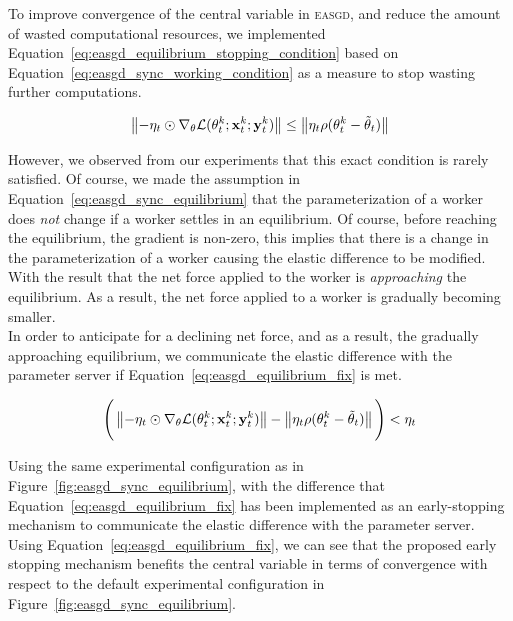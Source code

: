 To improve convergence of the central variable in \textsc{easgd}, and reduce the amount of wasted computational resources, we implemented Equation~\ref{eq:easgd_equilibrium_stopping_condition} based on Equation~\ref{eq:easgd_sync_working_condition} as a measure to stop wasting further computations.

\begin{equation}
  \label{eq:easgd_equilibrium_stopping_condition}
  \left\lVert-\eta_t \odot \nabla_\theta \mathcal{L}(\theta^k_t;\mathbf{x}^k_t;\mathbf{y}^k_t)\right\rVert \leq \left\lVert\eta_t\rho(\theta^k_t - \tilde{\theta}_t)\right\rVert
\end{equation}

However, we observed from our experiments that this exact condition is rarely satisfied. Of course, we made the assumption in Equation~\ref{eq:easgd_sync_equilibrium} that the parameterization of a worker does \emph{not} change if a worker settles in an equilibrium. Of course, before reaching the equilibrium, the gradient is non-zero, this implies that there is a change in the parameterization of a worker causing the elastic difference to be modified. With the result that the net force applied to the worker is \emph{approaching} the equilibrium. As a result, the net force applied to a worker is gradually becoming smaller.\\

In order to anticipate for a declining net force, and as a result, the gradually approaching equilibrium, we communicate the elastic difference with the parameter server if Equation~\ref{eq:easgd_equilibrium_fix} is met.

\begin{equation}
  \label{eq:easgd_equilibrium_fix}
  \Bigg(\left\lVert-\eta_t \odot \nabla_\theta \mathcal{L}(\theta^k_t;\mathbf{x}^k_t;\mathbf{y}^k_t)\right\rVert - \left\lVert\eta_t\rho(\theta^k_t - \tilde{\theta}_t)\right\rVert\Bigg) < \eta_t
\end{equation}

Using the same experimental configuration as in Figure~\ref{fig:easgd_sync_equilibrium}, with the difference that Equation~\ref{eq:easgd_equilibrium_fix} has been implemented as an early-stopping mechanism to communicate the elastic difference with the parameter server. Using Equation~\ref{eq:easgd_equilibrium_fix}, we can see that the proposed early stopping mechanism benefits the central variable in terms of convergence with respect to the default experimental configuration in Figure~\ref{fig:easgd_sync_equilibrium}.\\

